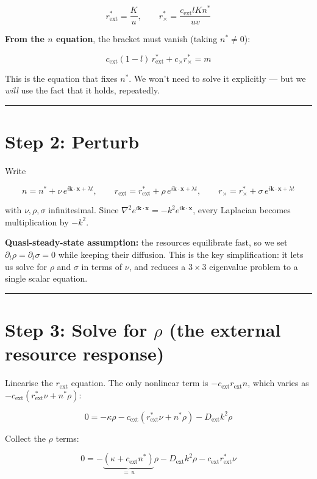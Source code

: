\documentclass[11pt]{article}
\begin{document}
\[
r_{\text{ext}}^* = \frac{K}{u}, \qquad r_\times^* = \frac{c_{\text{ext}} l K n^*}{uv}
\]

\textbf{From the $n$ equation}, the bracket must vanish (taking $n^*\neq 0$):

\[
c_{\text{ext}}(1-l)\, r_{\text{ext}}^* + c_\times r_\times^* = m
\]

This is the equation that fixes $n^*$. We won't need to solve it explicitly --- but we \emph{will} use the fact that it holds, repeatedly.

\bigskip\hrule\bigskip

\section*{Step 2: Perturb}

Write

\[
n = n^* + \nu\, e^{i\mathbf{k}\cdot\mathbf{x} + \lambda t}, \qquad r_{\text{ext}} = r_{\text{ext}}^* + \rho\, e^{i\mathbf{k}\cdot\mathbf{x}+\lambda t}, \qquad r_\times = r_\times^* + \sigma\, e^{i\mathbf{k}\cdot\mathbf{x}+\lambda t}
\]

with $\nu, \rho, \sigma$ infinitesimal. Since $\nabla^2 e^{i\mathbf{k}\cdot\mathbf{x}} = -k^2 e^{i\mathbf{k}\cdot\mathbf{x}}$, every Laplacian becomes multiplication by $-k^2$.

\textbf{Quasi-steady-state assumption:} the resources equilibrate fast, so we set $\partial_t \rho = \partial_t\sigma = 0$ while keeping their diffusion. This is the key simplification: it lets us solve for $\rho$ and $\sigma$ in terms of $\nu$, and reduces a $3\times3$ eigenvalue problem to a single scalar equation.

\bigskip\hrule\bigskip

\section*{Step 3: Solve for $\rho$ (the external resource response)}

Linearise the $r_{\text{ext}}$ equation. The only nonlinear term is $-c_{\text{ext}} r_{\text{ext}} n$, which varies as $-c_{\text{ext}}(r_{\text{ext}}^*\nu + n^*\rho)$:

\[
0 = -\kappa\rho - c_{\text{ext}}\left(r_{\text{ext}}^*\nu + n^*\rho\right) - D_{\text{ext}}k^2\rho
\]

Collect the $\rho$ terms:

\[
0 = -\underbrace{\left(\kappa + c_{\text{ext}}n^*\right)}_{=\,u}\rho - D_{\text{ext}}k^2\rho - c_{\text{ext}}r_{\text{ext}}^*\nu
\]
\end{document}
